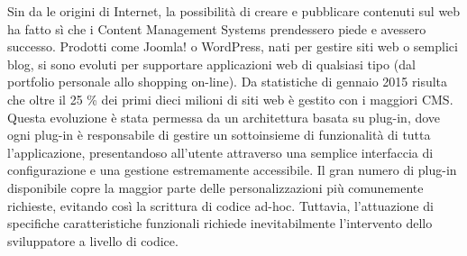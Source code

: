Sin da le origini di Internet, la possibilità di creare e pubblicare contenuti sul web ha fatto sì che i Content Management Systems prendessero piede e avessero successo. Prodotti come Joomla! o WordPress, nati per gestire siti web o semplici blog, si sono evoluti per supportare applicazioni web di qualsiasi tipo (dal portfolio personale allo shopping on-line). Da statistiche di gennaio 2015 risulta che oltre il 25 \% dei primi dieci milioni di siti web è gestito con i maggiori CMS\cite{cms_stats}. Questa evoluzione è stata permessa da un architettura basata su plug-in, dove ogni plug-in è responsabile di gestire un sottoinsieme di funzionalità di tutta l'applicazione, presentandoso all'utente attraverso una semplice interfaccia di configurazione e una gestione estremamente accessibile.
Il gran numero di plug-in disponibile copre la maggior parte delle personalizzazioni più comunemente richieste, evitando così la scrittura di codice ad-hoc. Tuttavia, l'attuazione di specifiche caratteristiche funzionali richiede inevitabilmente l'intervento dello sviluppatore a livello di codice.